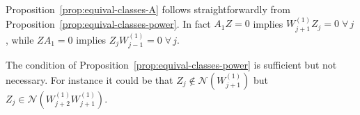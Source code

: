 \documentclass{article}
\newcommand{\1}{\mathds{1}}
\begin{document}
Proposition~\ref{prop:equival-classes-A} follows straightforwardly from Proposition~\ref{prop:equival-classes-power}. 
In fact $ A_1Z =0 $ implies $ W_{j+1}^{(1)} Z_j =0 \; \forall \,j$, while $ ZA_1=0$ implies $ Z_j W_{j-1}^{(1)}=0 \; \forall \,j $.

The condition of Proposition~\ref{prop:equival-classes-power} is sufficient but not necessary. For instance it could be that $ Z_j \notin \mathcal{N}(W_{j+1}^{(1)}) $ but $ Z_j \in \mathcal{N}(W_{j+2}^{(1)}W_{j+1}^{(1)}) $.

%
%


\newpage 
\end{document}
